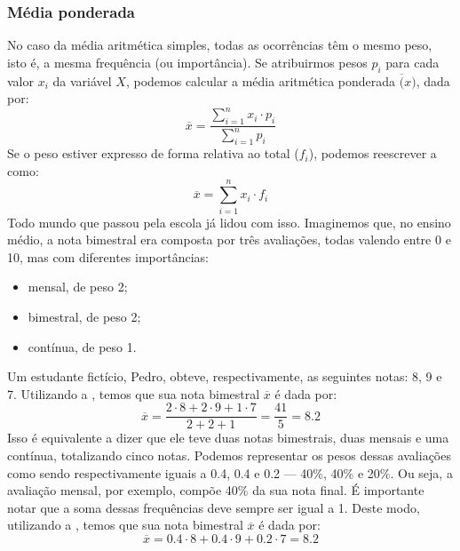 \subsubsection{Média ponderada}
No caso da média aritmética simples, todas as ocorrências têm o mesmo peso,
isto é, a mesma frequência (ou importância). Se atribuirmos pesos $p_i$ para
cada valor $x_i$ da variável $X$, podemos calcular a média aritmética ponderada
$\overline(x)$, dada por:
\begin{equation}
    \overline{x} = \frac{\sum_{i=1}^{n} x_i \cdot p_i}{\sum_{i=1}^{n} p_i}
    \label{eq:media-ponderada}
\end{equation}
Se o peso estiver expresso de forma relativa ao total ($f_i$), podemos
reescrever a  como:
\begin{equation}
    \overline{x} = \sum_{i=1}^{n} x_i \cdot f_i
    \label{eq:media-ponderada-relativa}
\end{equation}
Todo mundo que passou pela escola já lidou com isso. Imaginemos que, no ensino
médio, a nota bimestral era composta por três avaliações, todas valendo entre 0
e 10, mas com diferentes importâncias:
\begin{itemize}
    \item mensal, de peso 2;
    \item bimestral, de peso 2;
    \item contínua, de peso 1.
\end{itemize}
Um estudante fictício, Pedro, obteve, respectivamente, as seguintes notas: 8, 9
e 7. Utilizando a , temos que sua nota bimestral
$\overline{x}$ é dada por:
 \[
    \overline{x} = \frac{2 \cdot 8 + 2 \cdot 9 + 1 \cdot 7}{2 + 2 + 1}
    = \frac{41}{5} = 8.2
\]
Isso é equivalente a dizer que ele teve duas notas bimestrais, duas mensais e
uma contínua, totalizando cinco notas. Podemos representar os pesos dessas
avaliações como sendo respectivamente iguais a 0.4, 0.4 e 0.2 --- 40\%, 40\% e
20\%. Ou seja, a avaliação mensal, por exemplo, compõe 40\% da sua nota final.
É importante notar que a soma dessas frequências deve sempre ser igual a 1.
Deste modo, utilizando a , temos que sua nota
bimestral $\overline{x}$ é dada por:
 \[
    \overline{x} = 0.4 \cdot 8 + 0.4 \cdot 9 + 0.2 \cdot 7 = 8.2
\]

